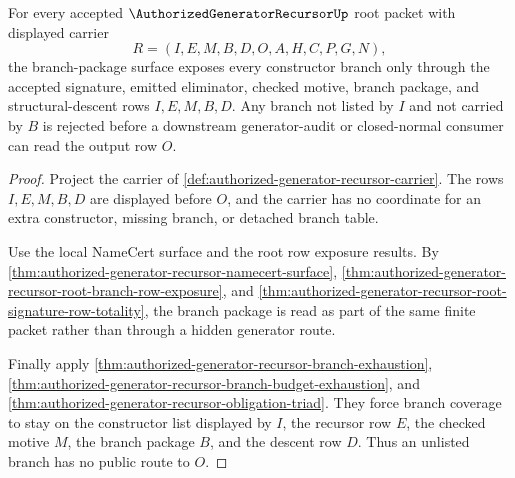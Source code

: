 \begin{theorem}
\label{thm:authorized-generator-recursor-root-branch-package-coverage}
For every accepted $\AuthorizedGeneratorRecursorUp$ root packet with displayed carrier
$$
R=(I,E,M,B,D,O,A,H,C,P,G,N),
$$
the branch-package surface exposes every constructor branch only through the accepted signature, emitted eliminator, checked motive, branch package, and structural-descent rows $I,E,M,B,D$. Any branch not listed by $I$ and not carried by $B$ is rejected before a downstream generator-audit or closed-normal consumer can read the output row $O$.
\end{theorem}
\begin{proof}
Project the carrier of \autoref{def:authorized-generator-recursor-carrier}. The rows $I,E,M,B,D$ are displayed before $O$, and the carrier has no coordinate for an extra constructor, missing branch, or detached branch table.

Use the local NameCert surface and the root row exposure results. By \autoref{thm:authorized-generator-recursor-namecert-surface}, \autoref{thm:authorized-generator-recursor-root-branch-row-exposure}, and \autoref{thm:authorized-generator-recursor-root-signature-row-totality}, the branch package is read as part of the same finite packet rather than through a hidden generator route.

Finally apply \autoref{thm:authorized-generator-recursor-branch-exhaustion}, \autoref{thm:authorized-generator-recursor-branch-budget-exhaustion}, and \autoref{thm:authorized-generator-recursor-obligation-triad}. They force branch coverage to stay on the constructor list displayed by $I$, the recursor row $E$, the checked motive $M$, the branch package $B$, and the descent row $D$. Thus an unlisted branch has no public route to $O$.
\end{proof}

